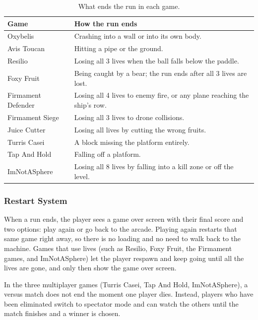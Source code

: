 \documentclass[12pt,letterpaper]{article}
\begin{document}
\begin{table}[H]
\centering
\footnotesize
\begin{tabular}{|p{3.2cm}|p{12cm}|}
\hline
\textbf{Game} & \textbf{How the run ends} \\
\hline
Oxybelis & Crashing into a wall or into its own body. \\
\hline
Avis Toucan & Hitting a pipe or the ground. \\
\hline
Resilio & Losing all 3 lives when the ball falls below the paddle. \\
\hline
Foxy Fruit & Being caught by a bear; the run ends after all 3 lives are lost. \\
\hline
Firmament Defender & Losing all 4 lives to enemy fire, or any plane reaching the ship's row. \\
\hline
Firmament Siege & Losing all 3 lives to drone collisions. \\
\hline
Juice Cutter & Losing all lives by cutting the wrong fruits. \\
\hline
Turris Casei & A block missing the platform entirely. \\
\hline
Tap And Hold & Falling off a platform. \\
\hline
ImNotASphere & Losing all 8 lives by falling into a kill zone or off the level. \\
\hline
\end{tabular}
\caption{What ends the run in each game.}
\end{table}

\subsubsection{Restart System}

When a run ends, the player sees a game over screen with their final score and two options: play again or go back to the arcade. Playing again restarts that same game right away, so there is no loading and no need to walk back to the machine. Games that use lives (such as Resilio, Foxy Fruit, the Firmament games, and ImNotASphere) let the player respawn and keep going until all the lives are gone, and only then show the game over screen.

In the three multiplayer games (Turris Casei, Tap And Hold, ImNotASphere), a versus match does not end the moment one player dies. Instead, players who have been eliminated switch to spectator mode and can watch the others until the match finishes and a winner is chosen.
\end{document}
